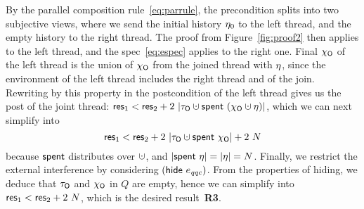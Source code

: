 %
By the parallel composition rule~\eqref{eq:parrule}, the precondition
splits into two subjective views, where we send the initial history
$\eta_0$ to the left thread, and the empty history to the right
thread. The proof from Figure~\ref{fig:proof2} then applies to the
left thread, and the spec~\eqref{eq:espec} applies to the right
one. Final $\chi_{\mathsf{O}}$ of the left thread is the union of $\chi_{\mathsf{O}}$ from
the joined thread with $\eta$, since the environment of the left
thread includes the right thread and of the join. Rewriting by this
property in the postcondition of the left thread gives us the post of
the joint thread: $\res_1 < \res_2 +2\ |\tkno \hunion \Tomb~(\histo
\hunion \gist)|$, which we can next simplify into
\[
\res_1 < \res_2 + 2\ |\tkno \hunion \Tomb~\histo| + 2\ N
\]
because $\mathsf{spent}$ distributes over $\hunion$, and $|\mathsf{spent}~\eta| =
|\eta| = N$. Finally, we restrict the external interference by
considering $(\mathsf{hide}~e_{\mathit{qqc}})$. From the properties of hiding,
we deduce that $\tau_{\mathsf{O}}$ and $\chi_{\mathsf{O}}$ in $Q$ are empty, hence we can
simplify into $\mathsf{res}_1 < \mathsf{res}_2 + 2 \ N$, which is the desired
result~\textbf{R3}.
%
